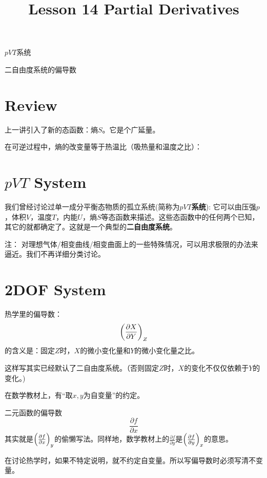 \documentclass[CJK]{beamer}
\title{Lesson 14 Partial Derivatives}
\author{}
\date{}
\begin{document}


\begin{frame}
\bchL
\bitem
\item{$pVT$系统}
\item{二自由度系统的偏导数}
\eitem
\echL
\end{frame}

\section{Review}

\begin{frame}
\bchL
上一讲引入了新的态函数：熵$S$。它是个广延量。

在{\blue 可逆过程中，熵的改变量等于热温比}（吸热量和温度之比）：

\echL
\end{frame}


\section{$pVT$ System}

\begin{frame}
\bchL
我们曾经讨论过单一成分平衡态物质的孤立系统(简称为{\bf $pVT$系统}): 它可以由压强$p$，体积$V$，温度$T$，内能$U$，熵$S$等态函数来描述。这些态函数中的任何两个已知，其它的就都确定了。这就是一个典型的{\bf 二自由度系统}。

{\small 注： 对理想气体/相变曲线/相变曲面上的一些特殊情况，可以用求极限的办法来逼近。我们不再详细分类讨论。}
\echL
\end{frame}




\section{2DOF System}

\begin{frame}
\bchL
热学里的偏导数：
$$\left(\frac{\partial X}{\partial Y}\right)_{Z} $$
的含义是：固定$Z$时，$X$的微小变化量和$Y$的微小变化量之比。

\skipline

这样写其实已经默认了二自由度系统。（否则固定$Z$时，$X$的变化不仅仅依赖于$Y$的变化。)

\echL
\end{frame}

\begin{frame}
\bchL
在数学教材上，有``取$x,y$为自变量''的约定。

二元函数的偏导数
$$\frac{\partial f}{\partial x}$$
其实就是$\left(\frac{\partial f}{\partial x}\right)_{y}$的偷懒写法。同样地，数学教材上的$\frac{\partial f}{\partial y}$是$\left(\frac{\partial f}{\partial y}\right)_{x}$的意思。

在讨论热学时，如果不特定说明，就不约定自变量。所以写偏导数时必须写清不变量。

\echL
\end{frame}
\end{document}
